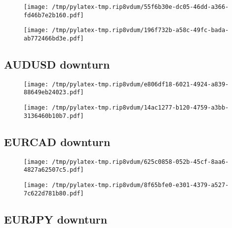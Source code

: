 \documentclass{article}%
\begin{document}
\begin{figure}[htbp]%
\centering%
\texttt{[image: /tmp/pylatex-tmp.rip8vdum/55f6b30e-dc05-46dd-a366-fd46b7e2b160.pdf]}%
\end{figure}

%


\begin{figure}[htbp]%
\centering%
\texttt{[image: /tmp/pylatex-tmp.rip8vdum/196f732b-a58c-49fc-bada-ab772466bd3e.pdf]}%
\end{figure}

%
\newpage %
\subsection{AUDUSD downturn}%
\label{subsec:AUDUSDdownturn}%


\begin{figure}[htbp]%
\centering%
\texttt{[image: /tmp/pylatex-tmp.rip8vdum/e806df18-6021-4924-a839-88649eb24023.pdf]}%
\end{figure}

%


\begin{figure}[htbp]%
\centering%
\texttt{[image: /tmp/pylatex-tmp.rip8vdum/14ac1277-b120-4759-a3bb-3136460b10b7.pdf]}%
\end{figure}

%
\newpage %
\subsection{EURCAD downturn}%
\label{subsec:EURCADdownturn}%


\begin{figure}[htbp]%
\centering%
\texttt{[image: /tmp/pylatex-tmp.rip8vdum/625c0858-052b-45cf-8aa6-4827a62507c5.pdf]}%
\end{figure}

%


\begin{figure}[htbp]%
\centering%
\texttt{[image: /tmp/pylatex-tmp.rip8vdum/8f65bfe0-e301-4379-a527-7c622d781b80.pdf]}%
\end{figure}

%
\newpage %
\subsection{EURJPY downturn}%
\label{subsec:EURJPYdownturn}%
\end{document}
